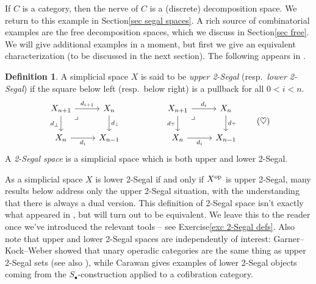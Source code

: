 \documentclass{conm-p-l}
\theoremstyle{definition}
\newtheorem{definition}[theorem]{Definition}
\theoremstyle{remark}
\newcommand{\op}{\textup{op}}
\begin{document}
If $C$ is a category, then the nerve of $C$ is a (discrete) decomposition space.
We return to this example in Section\nobreakspace \ref {sec segal spaces}.
A rich source of combinatorial examples are the free decomposition spaces, which we discuss in Section\nobreakspace \ref {sec free}.
We will give additional examples in a moment, but first we give an equivalent characterization (to be discussed in the next section).
The following appears in \cite{Feller_et_al:E2SSU}.

\begin{definition}\label{def 2-segal}
A simplicial space $X$ is said to be \emph{upper 2-Segal} (resp.\ \emph{lower 2-Segal}) if the square below left (resp.\ below right) is a pullback for all $0 < i < n$.
\begin{equation} \label{eq upper and lower 2-Segal} \begin{tikzcd}
X_{n+1} \rar{d_{i+1}} \dar[swap]{d_\bot} \ar[dr, phantom, "\lrcorner" very near start] & X_n \dar{d_\bot} 
& & 
X_{n+1} \rar{d_i} \dar[swap]{d_\top} \ar[dr, phantom, "\lrcorner" very near start] & X_n \dar{d_\top}
\\
X_n \rar[swap]{d_i} & X_{n-1}
& & 
X_n \rar[swap]{d_i} & X_{n-1}
\end{tikzcd} 
\tag{$\heartsuit$}
\end{equation}
A \emph{2-Segal space} is a simplicial space which is both upper and lower 2-Segal.
\end{definition}

As a simplicial space $X$ is lower 2-Segal if and only if $X^\op$ is upper 2-Segal, many results below address only the upper 2-Segal situation, with the understanding that there is always a dual version.
This definition of 2-Segal space isn't exactly what appeared in \cite{Stern:BIRS}, but will turn out to be equivalent.
We leave this to the reader once we've introduced the relevant tools --
see Exercise\nobreakspace \ref {exc 2-Segal defs}.
Also note that upper and lower 2-Segal spaces are independently of interest: Garner--Kock--Weber \cite{GarnerKockWeber:OCD} showed that unary operadic categories are the same thing as upper 2-Segal sets (see also \cite{Hackney:OC2SS}), while Carawan \cite{Carawan:2SMACWC} gives examples of lower 2-Segal objects coming from the $S_\bullet$-construction applied to a cofibration category.
\end{document}
